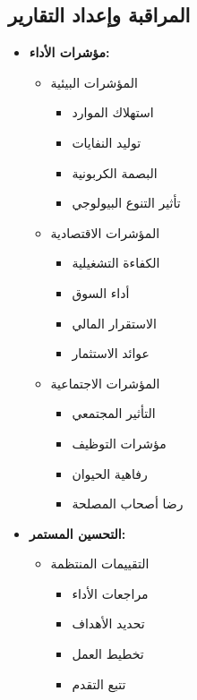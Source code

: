 \subsection{المراقبة وإعداد التقارير}
\begin{itemize}
    \item \textbf{مؤشرات الأداء:}
    \begin{itemize}
        \item المؤشرات البيئية
        \begin{itemize}
            \item استهلاك الموارد
            \item توليد النفايات
            \item البصمة الكربونية
            \item تأثير التنوع البيولوجي
        \end{itemize}
        
        \item المؤشرات الاقتصادية
        \begin{itemize}
            \item الكفاءة التشغيلية
            \item أداء السوق
            \item الاستقرار المالي
            \item عوائد الاستثمار
        \end{itemize}
        
        \item المؤشرات الاجتماعية
        \begin{itemize}
            \item التأثير المجتمعي
            \item مؤشرات التوظيف
            \item رفاهية الحيوان
            \item رضا أصحاب المصلحة
        \end{itemize}
    \end{itemize}
    
    \item \textbf{التحسين المستمر:}
    \begin{itemize}
        \item التقييمات المنتظمة
        \begin{itemize}
            \item مراجعات الأداء
            \item تحديد الأهداف
            \item تخطيط العمل
            \item تتبع التقدم
        \end{itemize}
        

\end{itemize}
\end{itemize}

